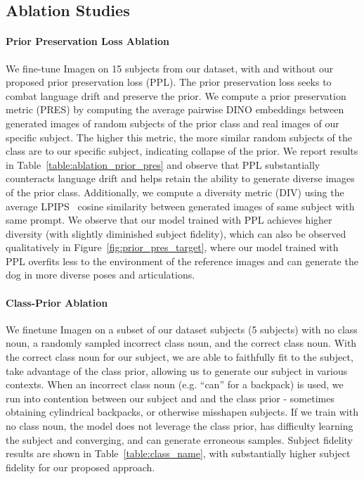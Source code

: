 \subsection{Ablation Studies}
\label{sec:app_ablation}

\paragraph{Prior Preservation Loss Ablation} We fine-tune Imagen on 15 subjects from our dataset, with and without our proposed prior preservation loss (PPL). The prior preservation loss seeks to combat language drift and preserve the prior. We compute a prior preservation metric (PRES) by computing the average pairwise DINO embeddings between generated images of random subjects of the prior class and real images of our specific subject. The higher this metric, the more similar random subjects of the class are to our specific subject, indicating collapse of the prior. We report results in Table~\ref{table:ablation_prior_pres} and observe that PPL substantially counteracts language drift and helps retain the ability to generate diverse images of the prior class. Additionally, we compute a diversity metric (DIV) using the average LPIPS~\cite{zhang2018perceptual} cosine similarity between generated images of same subject with same prompt. We observe that our model trained with PPL achieves higher diversity (with slightly diminished subject fidelity), which can also be observed qualitatively in Figure~\ref{fig:prior_pres_target}, where our model trained with PPL overfits less to the environment of the reference images and can generate the dog in more diverse poses and articulations.

\paragraph{Class-Prior Ablation} We finetune Imagen on a subset of our dataset subjects (5 subjects) with no class noun, a randomly sampled incorrect class noun, and the correct class noun. With the correct class noun for our subject, we are able to faithfully fit to the subject, take advantage of the class prior, allowing us to generate our subject in various contexts. When an incorrect class noun (e.g. ``can'' for a backpack) is used, we run into contention between our subject and and the class prior - sometimes obtaining cylindrical backpacks, or otherwise misshapen subjects. If we train with no class noun, the model does not leverage the class prior, has difficulty learning the subject and converging, and can generate erroneous samples. Subject fidelity results are shown in Table~\ref{table:class_name}, with substantially higher subject fidelity for our proposed approach.

